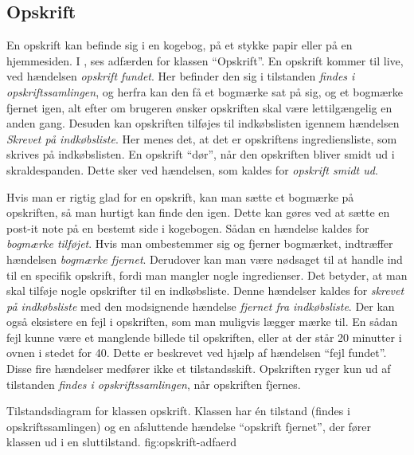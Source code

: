 \subsection{Opskrift}
En opskrift kan befinde sig i en kogebog, på et stykke papir eller på en hjemmesiden. I , ses adfærden for klassen ``Opskrift''. En opskrift kommer til live, ved hændelsen \textit{opskrift fundet}. Her befinder den sig i tilstanden \textit{findes i opskriftssamlingen}, og herfra kan den få et bogmærke sat på sig, og et bogmærke fjernet igen, alt efter om brugeren ønsker opskriften skal være lettilgængelig en anden gang. Desuden kan opskriften tilføjes til indkøbslisten igennem hændelsen \textit{Skrevet på indkøbsliste}. Her menes det, at det er opskriftens ingrediensliste, som skrives på indkøbslisten. En opskrift ``dør'', når den opskriften bliver smidt ud i skraldespanden. Dette sker ved hændelsen, som kaldes for \textit{opskrift smidt ud}.  

Hvis man er rigtig glad for en opskrift, kan man sætte et bogmærke på opskriften, så man hurtigt kan finde den igen. Dette kan \fx gøres ved at sætte en post-it note på en bestemt side i kogebogen. Sådan en hændelse kaldes for \textit{bogmærke tilføjet}. Hvis man ombestemmer sig og fjerner bogmærket, indtræffer hændelsen \textit{bogmærke fjernet}. Derudover kan man være nødsaget til at handle ind til en specifik opskrift, fordi man mangler nogle ingredienser. Det betyder, at man skal tilføje nogle opskrifter til en indkøbsliste. Denne hændelser kaldes for \textit{skrevet på indkøbsliste} med den modsignende hændelse \textit{fjernet fra indkøbsliste}. Der kan også eksistere en fejl i opskriften, som man muligvis lægger mærke til. En sådan fejl kunne være et manglende billede til opskriften, eller at der står 20 minutter i ovnen i stedet for 40. Dette er beskrevet ved hjælp af hændelsen ``fejl fundet''. Disse fire hændelser medfører ikke et tilstandsskift. Opskriften ryger kun ud af tilstanden \textit{findes i opskriftssamlingen}, når opskriften fjernes.

  {Tilstandsdiagram for klassen opskrift. Klassen har én tilstand (findes i opskriftssamlingen) og en afsluttende hændelse ``opskrift fjernet'', der fører klassen ud i en sluttilstand.}
  {fig:opskrift-adfaerd}
